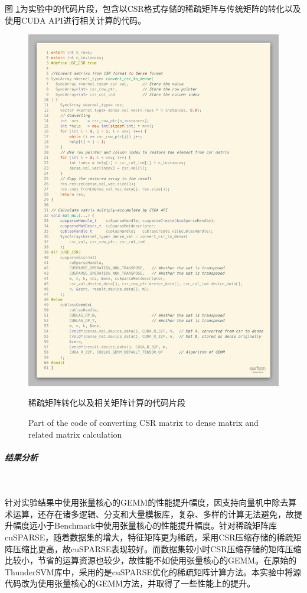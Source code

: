 \par 图 \ref{Fig-SVMSRC}为实验中的代码片段，包含以CSR格式存储的稀疏矩阵与传统矩阵的转化以及使用CUDA API进行相关计算的代码。
\begin{figure}
	\centering
	\includegraphics[width=15cm]{figures/SMOSVMSRC.jpg}
	\renewcommand{\thefigure}{\arabic{section}-\arabic{figure} }
	\renewcommand{\figurename}{图}
	\caption{稀疏矩阵转化以及相关矩阵计算的代码片段}
	\addtocounter{figure}{-1}
	\renewcommand{\thefigure}{\arabic{section}-\arabic{figure} }
	\renewcommand{\figurename}{Figure}
	\caption{Part of the code of converting CSR matrix to dense matrix and related matrix calculation}
	\label{Fig-SVMSRC}
\end{figure}
\subparagraph{结果分析}~{}
\par 针对实验结果中使用张量核心的GEMM的性能提升幅度，因支持向量机中除去算术运算，还存在诸多逻辑、分支和大量模板库，复杂、多样的计算无法避免，故提升幅度远小于Benchmark中使用张量核心的性能提升幅度。针对稀疏矩阵库cuSPARSE，随着数据集的增大，特征矩阵更为稀疏，采用CSR压缩存储的稀疏矩阵压缩比更高，故cuSPARSE表现较好。而数据集较小时CSR压缩存储的矩阵压缩比较小，节省的运算资源也较少，故性能不如使用张量核心的GEMM。在原始的ThunderSVM库中，采用的是cuSPARSE优化的稀疏矩阵计算方法。本实验中将源代码改为使用张量核心的GEMM方法，并取得了一些性能上的提升。
